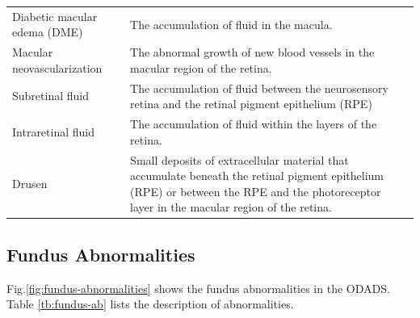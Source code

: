 \documentclass{article}
\begin{document}
{{\begin{longtable}{lp{3.8in}}
				\multicolumn{1}{l}{Diabetic macular edema (DME)}
				& The accumulation of fluid in the macula. \\

				\multicolumn{1}{l}{Macular neovascularization}
				& The abnormal growth of new blood vessels in the macular region of the retina.\\

				\multicolumn{1}{l}{Subretinal fluid}
				&  The accumulation of fluid between the neurosensory retina and the retinal pigment epithelium (RPE)\\

				\multicolumn{1}{l}{Intraretinal fluid}
				& The accumulation of fluid within the layers of the retina.\\
				
				\multicolumn{1}{l}{Drusen}
				& Small deposits of extracellular material that accumulate beneath the retinal pigment epithelium (RPE) or between the RPE and the photoreceptor layer in the macular region of the retina.\\

				\bottomrule
				\end{longtable}
			}
		}
	
	\subsection{Fundus Abnormalities}
	
	Fig.\ref{fig:fundus-abnormalities} shows the fundus abnormalities in the ODADS.
	Table \ref{tb:fundus-ab} lists the description of abnormalities.
	
\end{document}
